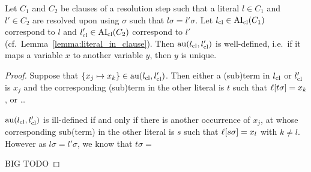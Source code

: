 \documentclass[,%
	paper=a4,%
	twoside=false,%
	liststotoc,
	bibtotoc,
	draft=false,%
	numbers=noendperiod
]{scrartcl}
\begin{document}
\begin{prop}
	Let $C_1$ and $C_2$ be clauses of a resolution step such that a literal $l\in C_1$ and $l' \in C_2$ are resolved upon using $\sigma$ such that $l\sigma = l'\sigma$.
	Let $l_\mathrm{cl} \in \operatorname{AI}_\mathrm{cl}(C_1)$ correspond to $l$ and $l_\mathrm{cl}' \in \operatorname{AI}_\mathrm{cl}(C_2)$ correspond to $l'$ (cf.\ Lemma~\ref{lemma:literal_in_clause}).
	Then
	$\operatorname{au}(l_\mathrm{cl}, l_\mathrm{cl}')$ is well-defined, i.e.~if it maps a variable $x$ to another variable $y$, then $y$ is unique.
\end{prop}
\begin{proof}
	Suppose that $\{x_j \mapsto x_k\} \in \operatorname{au}(l_\mathrm{cl}, l_\mathrm{cl}')$.
	Then either a (sub)term in $l_\mathrm{cl}$ or $l_\mathrm{cl}'$ is $x_j$ and the corresponding (sub)term in the other literal is $t$ such that $\ell[t\sigma] = x_k$, or \dots

	$\operatorname{au}(l_\mathrm{cl}, l_\mathrm{cl}')$ is ill-defined if and only if there is another occurrence of $x_j$, at whose corresponding sub(term) in the other literal is $s$ such that $\ell[s\sigma] = x_l$ with $k\neq l$.
	However as $l\sigma = l'\sigma$, we know that $t\sigma = $

	BIG TODO

\end{proof}
\end{document}
